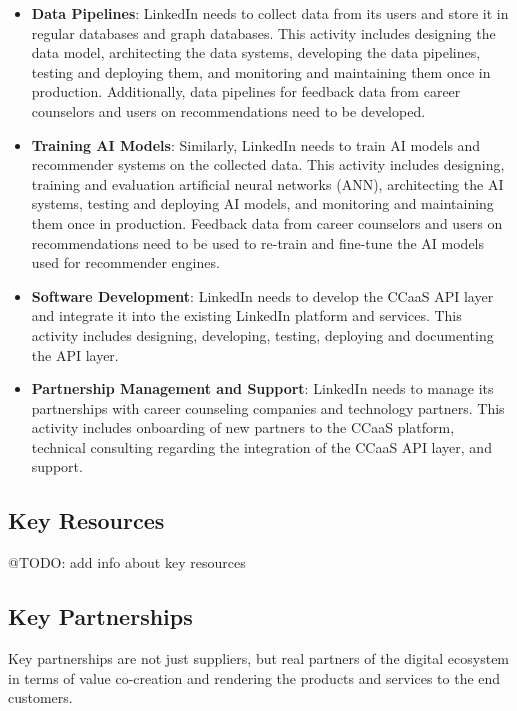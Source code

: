 \begin{itemize}
    \item \textbf{Data Pipelines}: LinkedIn needs to collect data from its users and store it in
            regular databases and graph databases. This activity includes designing the data model,
            architecting the data systems, developing the data pipelines, testing and deploying them,
            and monitoring and maintaining them once in production. Additionally, data pipelines for
            feedback data from career counselors and users on recommendations need to be developed.
    \item \textbf{Training AI Models}: Similarly, LinkedIn needs to train AI models and recommender
            systems on the collected data. This activity includes designing, training and evaluation
            artificial neural networks (ANN), architecting the AI systems, testing and deploying AI models,
            and monitoring and maintaining them once in production. Feedback data from career counselors
            and users on recommendations need to be used to re-train and fine-tune the AI models used 
            for recommender engines.
    \item \textbf{Software Development}: LinkedIn needs to develop the CCaaS API layer and integrate
            it into the existing LinkedIn platform and services. This activity includes designing, developing,
            testing, deploying and documenting the API layer.
    \item \textbf{Partnership Management and Support}: LinkedIn needs to manage its partnerships with
            career counseling companies and technology partners. This activity includes onboarding of
            new partners to the CCaaS platform, technical consulting regarding the integration of the 
            CCaaS API layer, and support.
\end{itemize}

\subsection{Key Resources}

{\color{red} @TODO: add info about key resources}

\subsection{Key Partnerships}

Key partnerships are not just suppliers, but real partners of the digital ecosystem in terms of value
co-creation and rendering the products and services to the end customers.

